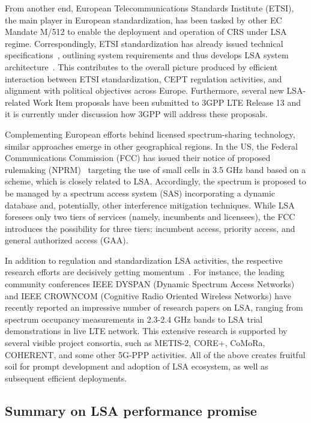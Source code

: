 \documentclass[journal]{IEEEtran}
\begin{document}
From another end, European Telecommunications Standards Institute (ETSI), the main player in European standardization, has been tasked by other EC Mandate M/512 to enable the deployment and operation of CRS under LSA regime. Correspondingly, ETSI standardization has already issued technical specifications~\cite{TS113}, \cite{TS154} outlining system requirements and thus develops LSA system architecture~\cite{TS235}. This contributes to the overall picture produced by efficient interaction between ETSI standardization, CEPT regulation activities, and alignment with political objectives across Europe. Furthermore, several new LSA-related Work Item proposals have been submitted to 3GPP LTE Release 13 and it is currently under discussion how 3GPP will address these proposals.

Complementing European efforts behind licensed spectrum-sharing technology, similar approaches emerge in other geographical regions. In the US, the Federal Communications Commission (FCC) has issued their notice of proposed rulemaking (NPRM)~\cite{FCC} targeting the use of small cells in 3.5 GHz band based on a scheme, which is closely related to LSA. Accordingly, the spectrum is proposed to be managed by a spectrum access system (SAS) incorporating a dynamic database and, potentially, other interference mitigation techniques. While LSA foresees only two tiers of services (namely, incumbents and licensees), the FCC introduces the possibility for three tiers: incumbent access, priority access, and general authorized access (GAA).

In addition to regulation and standardization LSA activities, the respective research efforts are decisively getting momentum~\cite{Mat13}. For instance, the leading community conferences IEEE DYSPAN (Dynamic Spectrum Access Networks) and IEEE CROWNCOM (Cognitive Radio Oriented Wireless Networks) have recently reported an impressive number of research papers on LSA, ranging from spectrum occupancy measurements in 2.3-2.4 GHz bands to LSA trial demonstrations in live LTE network. This extensive research is supported by several visible project consortia, such as METIS-2, CORE+, CoMoRa, COHERENT, and some other 5G-PPP activities. All of the above creates fruitful soil for prompt development and adoption of LSA ecosystem, as well as subsequent efficient deployments.
\subsection{Summary on LSA performance promise}
\end{document}
